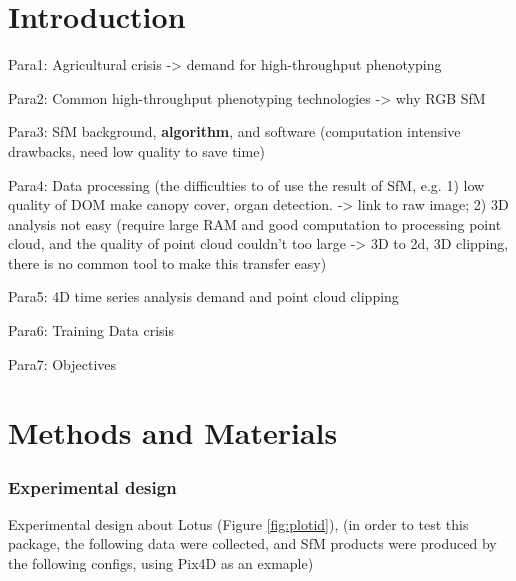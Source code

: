 \documentclass[sensors,article,submit,moreauthors, xelatex]{Definitions/mdpi}
\begin{document}
\section{Introduction}
Para1: Agricultural crisis -> demand for high-throughput phenotyping

Para2: Common high-throughput phenotyping technologies -> why RGB SfM

Para3: SfM background, \textbf{algorithm}, and software (computation intensive drawbacks, need low quality to save time)

Para4: Data processing (the difficulties to of use the result of SfM, e.g. 1) low quality of DOM make canopy cover, organ detection. -> link to raw image; 2) 3D analysis not easy (require large RAM and good computation to processing point cloud, and the quality of point cloud couldn't too large -> 3D to 2d, 3D clipping, there is no common tool to make this transfer easy)

Para5: 4D time series analysis demand and point cloud clipping

Para6: Training Data crisis

Para7: Objectives

\section{Methods and Materials}

\subsubsection{Experimental design}
Experimental design about Lotus (Figure  \ref{fig:plotid}), (in order to test this package, the following data were collected, and SfM products were produced by the following configs, using Pix4D as an exmaple)
\end{document}
